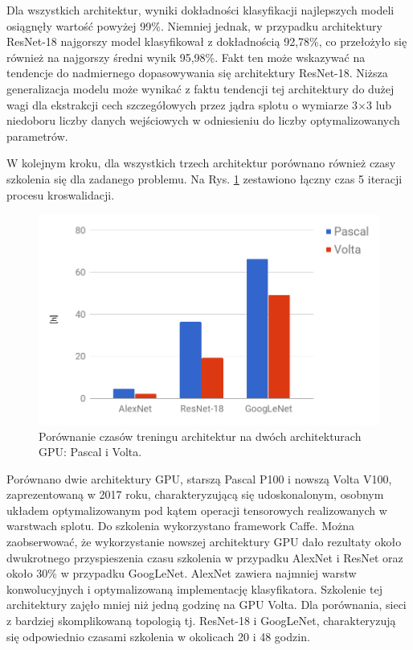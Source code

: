 Dla wszystkich architektur, wyniki dokładności klasyfikacji najlepszych modeli osiągnęły wartość powyżej 99\%. Niemniej jednak, w przypadku architektury ResNet-18 najgorszy model klasyfikował z dokładnością 92,78\%, co przełożyło się również na najgorszy średni wynik 95,98\%. Fakt ten może wskazywać na tendencje do nadmiernego dopasowywania się architektury ResNet-18. Niższa generalizacja modelu może wynikać z faktu tendencji tej architektury do dużej wagi dla ekstrakcji cech szczegółowych przez jądra splotu o wymiarze 3$\times$3 lub niedoboru liczby danych wejściowych w odniesieniu do liczby optymalizowanych parametrów.

W kolejnym kroku, dla wszystkich trzech architektur porównano również czasy szkolenia się dla zadanego problemu. Na Rys. \ref{fig:training_times} zestawiono łączny czas 5 iteracji procesu kroswalidacji.
\begin{figure}[h!]
	\includegraphics[width=\textwidth]{figures/TrainingtimesChart.png}
	\caption{Porównanie czasów treningu architektur na dwóch architekturach GPU: Pascal i Volta.}
	\label{fig:training_times}
\end{figure}
Porównano dwie architektury GPU, starszą Pascal P100 i nowszą Volta V100, zaprezentowaną w 2017 roku, charakteryzującą się udoskonalonym, osobnym układem optymalizowanym pod kątem operacji tensorowych realizowanych w warstwach splotu. Do szkolenia wykorzystano framework Caffe. Można zaobserwować, że wykorzystanie nowszej architektury GPU dało rezultaty około dwukrotnego przyspieszenia czasu szkolenia w przypadku AlexNet i ResNet oraz około 30\% w przypadku GoogLeNet. AlexNet zawiera najmniej warstw konwolucyjnych i optymalizowaną implementację klasyfikatora. Szkolenie tej architektury zajęło mniej niż jedną godzinę na GPU Volta. Dla porównania, sieci z bardziej skomplikowaną topologią tj. ResNet-18 i GoogLeNet, charakteryzują się odpowiednio czasami szkolenia w okolicach 20 i 48 godzin. 

